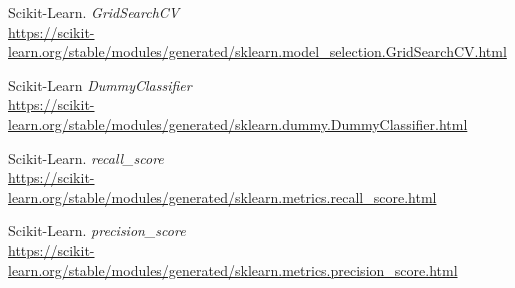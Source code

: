 \documentclass[11pt,a4paper]{article}
\begin{document}
\begin{thebibliography}{20}
Scikit-Learn. \textit{GridSearchCV}
\\\url{https://scikit-learn.org/stable/modules/generated/sklearn.model_selection.GridSearchCV.html}

Scikit-Learn \textit{DummyClassifier}
\\\url{https://scikit-learn.org/stable/modules/generated/sklearn.dummy.DummyClassifier.html}

Scikit-Learn. \textit{recall\_score}
\\\url{https://scikit-learn.org/stable/modules/generated/sklearn.metrics.recall_score.html}

Scikit-Learn. \textit{precision\_score}
\\\url{https://scikit-learn.org/stable/modules/generated/sklearn.metrics.precision_score.html}

\end{thebibliography}
\end{document}
